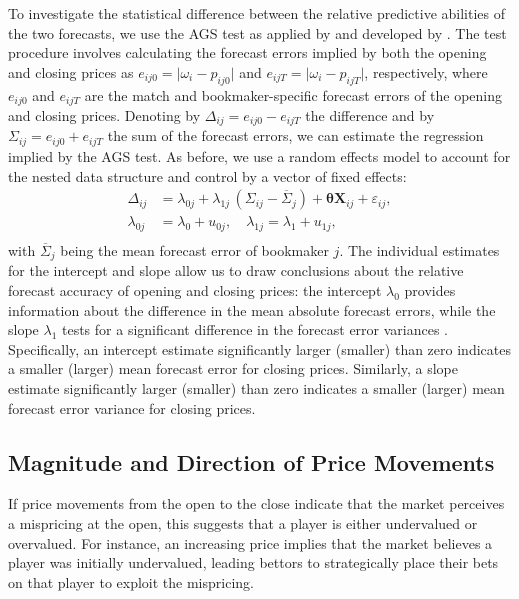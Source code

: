 \documentclass[webpdf,modern,medium]{oup-authoring-template}
\newcommand{\bs}{\boldsymbol}
\theoremstyle{thmstyleone}%
\theoremstyle{thmstyletwo}%
\theoremstyle{thmstylethree}%
\begin{document}
        To investigate the statistical difference between the relative predictive abilities of the two forecasts, we use the AGS test as applied by \citet{gandar1998} and developed by \citet{ashley1980}. The test procedure involves calculating the forecast errors implied by both the opening and closing prices as
         $  e_{ij0} = \lvert \omega_i - p_{ij0} \rvert$ and $e_{ijT} = \lvert \omega_i - p_{ijT} \rvert$, respectively,
        where $e_{ij0}$ and $e_{ijT}$ are the match and bookmaker-specific forecast errors of the opening and closing prices. Denoting by $\Delta_{ij} = e_{ij0} - e_{ijT}$ the difference and by $\Sigma_{ij} = e_{ij0} + e_{ijT}$ the sum of the forecast errors, we can estimate the regression implied by the AGS test.
        As before, we use a random effects model to account for the nested data structure and control by a vector of fixed effects:
        \begin{equation}
            \begin{split}
                \Delta_{ij} &= \lambda_{0j} + \lambda_{1j} \, (\Sigma_{ij} - \overline{\Sigma}_{j}) + \bs{\theta} \bs{X}_{ij} + \varepsilon_{ij}, \\
                \lambda_{0j} &= \lambda_{0} + u_{0j}, \quad  \lambda_{1j} = \lambda_{1} + u_{1j}, \\
            \end{split}
        \label{eq:ags_test}
        \end{equation}
        with $\overline{\Sigma}_{j}$ being the mean forecast error of bookmaker $j$.
        The individual estimates for the intercept and slope allow us to draw conclusions about the relative forecast accuracy of opening and closing prices: the intercept $\lambda_0$ provides information about the difference in the mean absolute forecast errors, while the slope $\lambda_1$ tests for a significant difference in the forecast error variances \citep{gandar1998}. Specifically, an intercept estimate significantly larger (smaller) than zero indicates a smaller (larger) mean forecast error for closing prices. Similarly, a slope estimate significantly larger (smaller) than zero indicates a smaller (larger) mean forecast error variance for closing prices.

    \subsection{Magnitude and Direction of Price Movements}

        If price movements from the open to the close indicate that the market perceives a mispricing at the open, this suggests that a player is either undervalued or overvalued. For instance, an increasing price implies that the market believes a player was initially undervalued, leading bettors to strategically place their bets on that player to exploit the mispricing.
\end{document}
